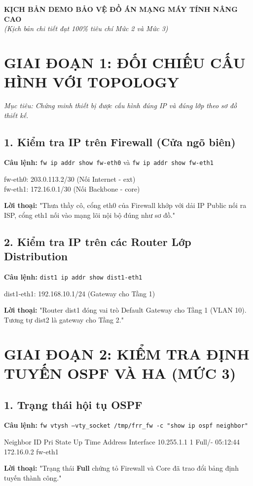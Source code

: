 \documentclass[12pt,a4paper]{article}
\begin{document}
\begin{center}
    \Large\textbf{KỊCH BẢN DEMO BẢO VỆ ĐỒ ÁN MẠNG MÁY TÍNH NÂNG CAO} \\
    \vspace{0.3cm}
    \normalsize\textit{(Kịch bản chi tiết đạt 100\% tiêu chí Mức 2 và Mức 3)}
\end{center}

\tableofcontents
\newpage

\section{GIAI ĐOẠN 1: ĐỐI CHIẾU CẤU HÌNH VỚI TOPOLOGY}
\textit{Mục tiêu: Chứng minh thiết bị được cấu hình đúng IP và đúng lớp theo sơ đồ thiết kế.}

\subsection{1. Kiểm tra IP trên Firewall (Cửa ngõ biên)}
\textbf{Câu lệnh:} \texttt{fw ip addr show fw-eth0} và \texttt{fw ip addr show fw-eth1}
\begin{expectedoutput}
fw-eth0: 203.0.113.2/30 (Nối Internet - ext) \\
fw-eth1: 172.16.0.1/30  (Nối Backbone - core)
\end{expectedoutput}
\textbf{Lời thoại:} "Thưa thầy cô, cổng eth0 của Firewall khớp với dải IP Public nối ra ISP, cổng eth1 nối vào mạng lõi nội bộ đúng như sơ đồ."

\subsection{2. Kiểm tra IP trên các Router Lớp Distribution}
\textbf{Câu lệnh:} \texttt{dist1 ip addr show dist1-eth1}
\begin{expectedoutput}
dist1-eth1: 192.168.10.1/24 (Gateway cho Tầng 1)
\end{expectedoutput}
\textbf{Lời thoại:} "Router dist1 đóng vai trò Default Gateway cho Tầng 1 (VLAN 10). Tương tự dist2 là gateway cho Tầng 2."

\section{GIAI ĐOẠN 2: KIỂM TRA ĐỊNH TUYẾN OSPF VÀ HA (MỨC 3)}

\subsection{1. Trạng thái hội tụ OSPF}
\textbf{Câu lệnh:} \texttt{fw vtysh --vty_socket /tmp/frr_fw -c "show ip ospf neighbor"}
\begin{expectedoutput}
Neighbor ID      Pri   State           Up Time     Address         Interface
10.255.1.1         1   Full/-          05:12:44    172.16.0.2      fw-eth1
\end{expectedoutput}
\textbf{Lời thoại: } "Trạng thái \textbf{Full} chứng tỏ Firewall và Core đã trao đổi bảng định tuyến thành công."
\end{document}
